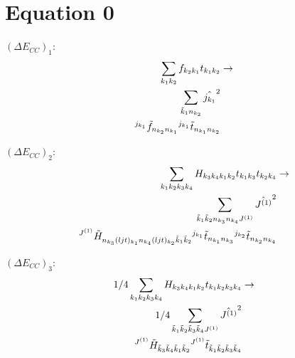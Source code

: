 \documentclass[11pt]{article}
\begin{document}
\section{Equation 0}
$\left({{\Delta E_{CC}}}\right)_{1}$:
\begin{align}
\sum_{{k}_{1}{k}_{2}}{f}_{{k}_{2}{k}_{1}}{t}_{{k}_{1}{k}_{2}}&\rightarrow \notag \\\sum_{\tilde{k}_{1}n_{{k}_{2}}}\hat{j_{{k}_{1}}}^{2}& \notag \\{}^{j_{{k}_{1}}}\tilde{f}_{n_{{k}_{2}}n_{{k}_{1}}}{}^{j_{{k}_{1}}}\tilde{t}_{n_{{k}_{1}}n_{{k}_{2}}}& \notag \\
\end{align}

$\left({{\Delta E_{CC}}}\right)_{2}$:
\begin{align}
\sum_{{k}_{1}{k}_{2}{k}_{3}{k}_{4}}{H}_{{k}_{3}{k}_{4}{k}_{1}{k}_{2}}{t}_{{k}_{1}{k}_{3}}{t}_{{k}_{2}{k}_{4}}&\rightarrow \notag \\\sum_{\tilde{k}_{1}\tilde{k}_{2}n_{{k}_{3}}n_{{k}_{4}}J^{(1)}}\hat{J^{(1)}}^{2}& \notag \\{}^{J^{(1)}}\tilde{H}_{n_{{k}_{3}}(ljt)_{{k}_{1}}n_{{k}_{4}}(ljt)_{{k}_{2}}\tilde{k}_{1}\tilde{k}_{2}}{}^{j_{{k}_{1}}}\tilde{t}_{n_{{k}_{1}}n_{{k}_{3}}}{}^{j_{{k}_{2}}}\tilde{t}_{n_{{k}_{2}}n_{{k}_{4}}}& \notag \\
\end{align}

$\left({{\Delta E_{CC}}}\right)_{3}$:
\begin{align}
1/4\sum_{{k}_{1}{k}_{2}{k}_{3}{k}_{4}}{H}_{{k}_{3}{k}_{4}{k}_{1}{k}_{2}}{t}_{{k}_{1}{k}_{2}{k}_{3}{k}_{4}}&\rightarrow \notag \\1/4\sum_{\tilde{k}_{1}\tilde{k}_{2}\tilde{k}_{3}\tilde{k}_{4}J^{(1)}}\hat{J^{(1)}}^{2}& \notag \\{}^{J^{(1)}}\tilde{H}_{\tilde{k}_{3}\tilde{k}_{4}\tilde{k}_{1}\tilde{k}_{2}}{}^{J^{(1)}}\tilde{t}_{\tilde{k}_{1}\tilde{k}_{2}\tilde{k}_{3}\tilde{k}_{4}}& \notag \\
\end{align}
\end{document}
